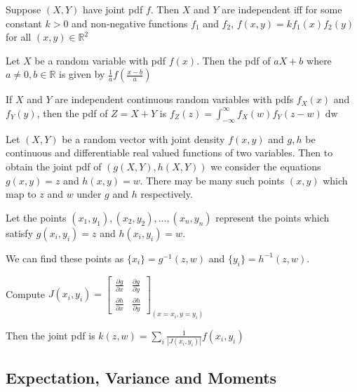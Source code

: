 \begin{thm}
    Suppose $(X,Y)$ have joint pdf $f$. Then $X$ and $Y$ are independent iff for some constant $k > 0$ and non-negative functions $f_1$ and $f_2$, $f(x,y) = k f_1(x)f_2(y)$ for all $(x,y) \in \mathbb{R}^2$
\end{thm}

\begin{thm}
    Let $X$ be a random variable with pdf $f(x)$. Then the pdf of $aX+b$ where $a \neq 0, b \in \mathbb{R}$ is given by $\displaystyle \frac{1}{a} f \left (\frac{x-b}{a} \right)$
\end{thm}

\begin{thm}
    If $X$ and $Y$ are independent continuous random variables with pdfs $f_X(x)$ and $f_Y(y)$, then the pdf of $Z = X+Y$ is $f_Z\left (z\right ) = \displaystyle\int_{- \infty}^\infty f_X \left (w\right ) f_Y \left (z - w\right ) \mathop{\mathrm{d} w}$
\end{thm}

\begin{prop}
    Let $(X,Y)$ be a random vector with joint density $f(x,y)$ and $g,h$ be continuous and differentiable real valued functions of two variables. Then to obtain the joint pdf of $(g(X,Y), h(X,Y))$ we consider the equations $g(x,y) = z$ and $h(x,y) = w$. There may be many such points $(x,y)$ which map to $z$ and $w$ under $g$ and $h$ respectively.

    Let the points $(x_1, y_1), (x_2, y_2), ..., (x_n, y_n)$ represent the points which satisfy $g(x_i, y_i) = z$ and $h(x_i, y_i) = w$.

    We can find these points as $\{x_i\} = g^{-1}(z,w)$ and $\{ y_i \} = h^{-1}(z,w)$.

    Compute $J(x_i, y_i) = \begin{bmatrix} \frac{\partial g}{\partial x} & \frac{\partial g}{\partial y} \\ \frac{\partial h}{\partial x} & \frac{\partial h}{\partial y} \end{bmatrix}_{(x = x_i, y = y_i)}$

        Then the joint pdf is $k(z,w) = \displaystyle \sum_i \frac{1}{|J(x_i, y_i)|} f(x_i, y_i)$
\end{prop}

\hhrule
\subsection*{Expectation, Variance and Moments}

